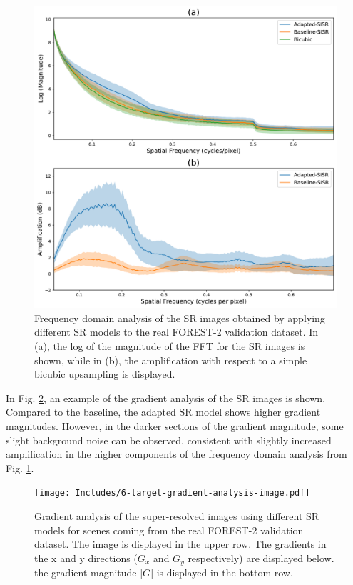         \begin{figure}[H]
            \centering
            \includegraphics[scale=0.5]{Includes/5-target-amplification-statistics.pdf}
            \caption{Frequency domain analysis of the SR images obtained by applying different SR models to the real FOREST-2 validation dataset.
            In (a), the log of the magnitude of the FFT for the SR images is shown,
            while in (b), the amplification with respect to a  simple bicubic upsampling is displayed.}
            \label{fig:5-target-amplification-statistics}
        \end{figure}


        In Fig. \ref{fig:6-target-gradient-analysis-image}, an example of the gradient analysis of the SR images is shown. 
        Compared to the baseline, the adapted SR model shows higher gradient magnitudes. However, in the darker sections of the gradient magnitude, some slight background noise can be observed, consistent with slightly increased amplification in the higher components of the frequency domain analysis from Fig. \ref{fig:5-target-amplification-statistics}.

        \begin{figure}[H]
            \centering
            \texttt{[image: Includes/6-target-gradient-analysis-image.pdf]}
            \caption{Gradient analysis of the super-resolved images using different SR models for scenes coming from the real FOREST-2 validation dataset.
                     The image is displayed in the upper row. The gradients in the x and y directions ($G_x$ and $G_y$ respectively) are displayed below.
                     the gradient magnitude $|G|$ is displayed in the bottom row.}
            \label{fig:6-target-gradient-analysis-image}
        \end{figure}

